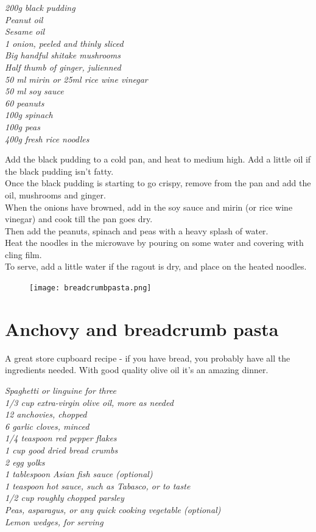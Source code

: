 \documentclass{tufte-book}
\begin{document}
\smallskip
\emph{200g black pudding
\\Peanut oil
\\Sesame oil
\\1 onion, peeled and thinly sliced
\\Big handful shitake mushrooms
\\Half thumb of ginger, julienned
\\50 ml mirin or 25ml rice wine vinegar
\\50 ml soy sauce
\\60 peanuts
\\100g spinach
\\100g peas
\\400g fresh rice noodles
}

\smallskip
Add the black pudding to a cold pan, and heat to medium high. Add a little oil if the black pudding isn't fatty. 
\\Once the black pudding is starting to go crispy, remove from the pan and add the oil, mushrooms and ginger.
\\When the onions have browned, add in the soy sauce and mirin (or rice wine vinegar) and cook till the pan goes dry.
\\Then add the peanuts, spinach and peas with a heavy splash of water.
\\Heat the noodles in the microwave by pouring on some water and covering with cling film.
\\To serve, add a little water if the ragout is dry, and place on the heated noodles.


\begin{figure}[h]
  \texttt{[image: breadcrumbpasta.png]}
\end{figure}

\section{Anchovy and breadcrumb pasta }

A great store cupboard recipe - if you have bread, you probably have all the ingredients needed. With good quality olive oil it's an amazing dinner.

\smallskip
\emph{Spaghetti or linguine for three
\\1/3 cup extra-virgin olive oil, more as needed
\\12 anchovies, chopped
\\6 garlic cloves, minced
\\1/4 teaspoon red pepper flakes
\\1 cup good dried bread crumbs
\\2 egg yolks
\\1 tablespoon Asian fish sauce (optional)
\\1 teaspoon hot sauce, such as Tabasco, or to taste
\\1/2 cup roughly chopped parsley
\\ Peas, asparagus, or any quick cooking vegetable (optional)
\\Lemon wedges, for serving}
\end{document}
